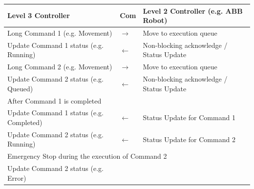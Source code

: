 \documentclass[11pt]{book}
\begin{document}
\begin{table}[H]
\begin{adjustbox}{max width=\textwidth}
\begin{tabular}{p{7.04cm}p{1.67cm}p{7.17cm}}
\hline
\multicolumn{1}{|p{7.04cm}}{{\footnotesize \textbf{Level 3 Controller}}} & 
\multicolumn{1}{|p{1.67cm}}{{\footnotesize \textbf{Com}}} & 
\multicolumn{1}{|p{7.17cm}|}{{\footnotesize \textbf{Level 2 Controller (e.g. ABB Robot)}}} \\ 
\hline
\multicolumn{1}{|p{7.04cm}}{{\footnotesize Long Command 1 (e.g. Movement)}} & 
\multicolumn{1}{|p{1.67cm}}{\centering
{\footnotesize $\rightarrow$}} & 
\multicolumn{1}{|p{7.17cm}|}{{\footnotesize Move to execution queue}} \\ 
\hline
\multicolumn{1}{|p{7.04cm}}{{\footnotesize Update Command 1 status (e.g. Running)}} & 
\multicolumn{1}{|p{1.67cm}}{\centering
{\footnotesize $\leftarrow$}} & 
\multicolumn{1}{|p{7.17cm}|}{{\footnotesize Non-blocking acknowledge / Status Update}} \\ 
\hline
\multicolumn{1}{|p{7.04cm}}{{\footnotesize Long Command 2 (e.g. Movement)}} & 
\multicolumn{1}{|p{1.67cm}}{\centering
{\footnotesize $\rightarrow$}} & 
\multicolumn{1}{|p{7.17cm}|}{{\footnotesize Move to execution queue}} \\ 
\hline
\multicolumn{1}{|p{7.04cm}}{{\footnotesize Update Command 2 status (e.g. Queued)}} & 
\multicolumn{1}{|p{1.67cm}}{\centering
{\footnotesize $\leftarrow$}} & 
\multicolumn{1}{|p{7.17cm}|}{{\footnotesize Non-blocking acknowledge / Status Update}} \\ 
\hline
\multicolumn{3}{|p{15.87cm}|}{{\footnotesize After Command 1 is completed}} \\ 
\hline
\multicolumn{1}{|p{7.04cm}}{{\footnotesize Update Command 1 status (e.g. Completed)}} & 
\multicolumn{1}{|p{1.67cm}}{\centering
{\footnotesize $\leftarrow$}} & 
\multicolumn{1}{|p{7.17cm}|}{{\footnotesize Status Update for Command 1}} \\ 
\hline
\multicolumn{1}{|p{7.04cm}}{{\footnotesize Update Command 2 status (e.g. Running)}} & 
\multicolumn{1}{|p{1.67cm}}{\centering
{\footnotesize $\leftarrow$}} & 
\multicolumn{1}{|p{7.17cm}|}{{\footnotesize Status Update for Command 2}} \\ 
\hline
\multicolumn{3}{|p{15.87cm}|}{{\footnotesize Emergency Stop during the execution of Command 2}} \\ 
\hline
\multicolumn{1}{|p{7.04cm}}{{\footnotesize Update Command 2 status (e.g. Error)}} & 
\multicolumn{1}{|p{1.67cm}}{\centering
}
\end{tabular}
\end{adjustbox}
\end{table}
\end{document}
